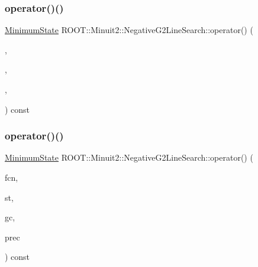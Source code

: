 \mbox{\label{classROOT_1_1Minuit2_1_1NegativeG2LineSearch_ac39ff4c0d14335bd8c8bdcede066ecdf}} 
\subsubsection{\texorpdfstring{operator()()}{operator()()}\hspace{0.1cm}{\footnotesize\ttfamily [1/2]}}
{\footnotesize\ttfamily \mbox{\hyperlink{classROOT_1_1Minuit2_1_1MinimumState}{Minimum\+State}} R\+O\+O\+T\+::\+Minuit2\+::\+Negative\+G2\+Line\+Search\+::operator() (\begin{DoxyParamCaption}\item[{const \mbox{\hyperlink{classROOT_1_1Minuit2_1_1MnFcn}{Mn\+Fcn}} \&}]{,  }\item[{const \mbox{\hyperlink{classROOT_1_1Minuit2_1_1MinimumState}{Minimum\+State}} \&}]{,  }\item[{const \mbox{\hyperlink{classROOT_1_1Minuit2_1_1GradientCalculator}{Gradient\+Calculator}} \&}]{,  }\item[{const \mbox{\hyperlink{classROOT_1_1Minuit2_1_1MnMachinePrecision}{Mn\+Machine\+Precision}} \&}]{ }\end{DoxyParamCaption}) const}

\mbox{\label{classROOT_1_1Minuit2_1_1NegativeG2LineSearch_ac39ff4c0d14335bd8c8bdcede066ecdf}} 
\subsubsection{\texorpdfstring{operator()()}{operator()()}\hspace{0.1cm}{\footnotesize\ttfamily [2/2]}}
{\footnotesize\ttfamily \mbox{\hyperlink{classROOT_1_1Minuit2_1_1MinimumState}{Minimum\+State}} R\+O\+O\+T\+::\+Minuit2\+::\+Negative\+G2\+Line\+Search\+::operator() (\begin{DoxyParamCaption}\item[{const \mbox{\hyperlink{classROOT_1_1Minuit2_1_1MnFcn}{Mn\+Fcn}} \&}]{fcn,  }\item[{const \mbox{\hyperlink{classROOT_1_1Minuit2_1_1MinimumState}{Minimum\+State}} \&}]{st,  }\item[{const \mbox{\hyperlink{classROOT_1_1Minuit2_1_1GradientCalculator}{Gradient\+Calculator}} \&}]{gc,  }\item[{const \mbox{\hyperlink{classROOT_1_1Minuit2_1_1MnMachinePrecision}{Mn\+Machine\+Precision}} \&}]{prec }\end{DoxyParamCaption}) const}

